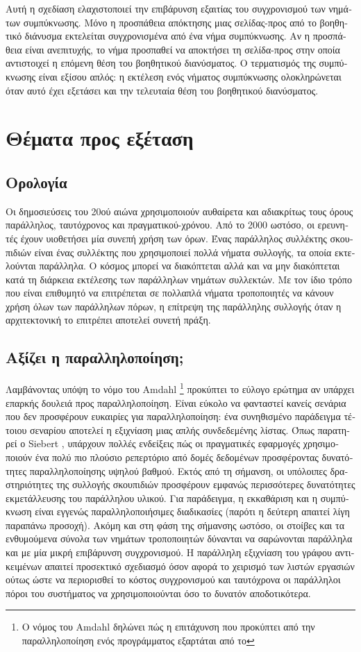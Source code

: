 \begin{greek}
Αυτή η σχεδίαση ελαχιστοποιεί την επιβάρυνση εξαιτίας του συγχρονισμού
των νημάτων συμπύκνωσης. Μόνο η προσπάθεια απόκτησης μιας σελίδας-προς
από το βοηθητικό διάνυσμα εκτελείται συγχρονισμένα από ένα νήμα
συμπύκνωσης. Αν η προσπάθεια είναι ανεπιτυχής, το νήμα προσπαθεί
να αποκτήσει τη σελίδα-προς στην οποία αντιστοιχεί η επόμενη
θέση του βοηθητικού διανύσματος. Ο τερματισμός της συμπύκνωσης
είναι εξίσου απλός: η εκτέλεση ενός νήματος συμπύκνωσης ολοκληρώνεται
όταν αυτό έχει εξετάσει και την τελευταία θέση του βοηθητικού
διανύσματος. 

\section{Θέματα προς εξέταση}
\subsection{Ορολογία}
Οι δημοσιεύσεις του 20ού αιώνα χρησιμοποιούν αυθαίρετα και
αδιακρίτως τους όρους παράλληλος, ταυτόχρονος και πραγματικού-χρόνου.
Από το 2000 ωστόσο, οι ερευνητές έχουν υιοθετήσει μία συνεπή
χρήση των όρων. Ένας παράλληλος συλλέκτης σκουπιδιών είναι ένας
συλλέκτης που χρησιμοποιεί πολλά νήματα συλλογής, τα οποία
εκτελούνται παράλληλα. Ο κόσμος μπορεί να διακόπτεται αλλά και
να μην διακόπτεται κατά τη διάρκεια εκτέλεσης των παράλληλων
νημάτων συλλεκτών. Με τον ίδιο τρόπο που είναι επιθυμητό να
επιτρέπεται σε πολλαπλά νήματα τροποποιητές να κάνουν χρήση
όλων των παράλληλων πόρων, η επίτρεψη της παράλληλης συλλογής
όταν η αρχιτεκτονική το επιτρέπει αποτελεί συνετή πράξη.

\subsection{Αξίζει η παραλληλοποίηση;}
Λαμβάνοντας υπόψη το νόμο του Amdahl \footnote{Ο νόμος του Amdahl
δηλώνει πώς η επιτάχυνση που προκύπτει από την παραλληλοποίηση
ενός προγράμματος εξαρτάται από το} προκύπτει το εύλογο ερώτημα
αν υπάρχει επαρκής δουλειά προς παραλληλοποίηση. Είναι εύκολο
να φανταστεί κανείς σενάρια που δεν προσφέρουν ευκαιρίες για
παραλληλοποίηση: ένα συνηθισμένο παράδειγμα τέτοιου σεναρίου
αποτελεί η εξιχνίαση μιας απλής συνδεδεμένης λίστας. Όπως
παρατηρεί ο Siebert \cite{DBLP:conf/iwmm/Siebert08}, υπάρχουν
πολλές ενδείξεις πώς οι πραγματικές εφαρμογές χρησιμοποιούν
ένα πολύ πιο πλούσιο ρεπερτόριο από δομές δεδομένων προσφέροντας
δυνατότητες παραλληλοποίησης υψηλού βαθμού. Εκτός από τη σήμανση,
οι υπόλοιπες δραστηριότητες της συλλογής σκουπιδιών προσφέρουν
εμφανώς περισσότερες δυνατότητες εκμετάλλευσης του παράλληλου
υλικού. Για παράδειγμα, η εκκαθάριση και η συμπύκνωση είναι
εγγενώς παραλληλοποιήσιμες διαδικασίες (παρότι η δεύτερη απαιτεί
λίγη παραπάνω προσοχή). Ακόμη και στη φάση της σήμανσης ωστόσο,
οι στοίβες και τα ενθυμούμενα σύνολα των νημάτων τροποποιητών
δύνανται να σαρώνονται παράλληλα και με μία μικρή επιβάρυνση
συγχρονισμού. Η παράλληλη εξιχνίαση του γράφου αντικειμένων
απαιτεί προσεκτικό σχεδιασμό όσον αφορά το χειρισμό των λιστών
εργασιών ούτως ώστε να περιορισθεί το κόστος συγχρονισμού και
ταυτόχρονα οι παράλληλοι πόροι του συστήματος να χρησιμοποιούνται
όσο το δυνατόν αποδοτικότερα.


\end{greek}
